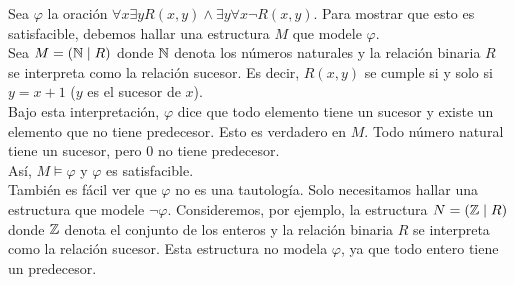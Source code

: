 \documentclass[12pt,a4paper]{book}
\begin{document}
    \begin{ejemplo}\label{ej:satisfacible-sucesor}
        Sea $\varphi$ la oración $\forall x\exists yR(x,y)\wedge\exists y\forall x\neg R(x,y)$. Para mostrar que esto es
        satisfacible, debemos hallar una estructura $M$ que modele $\varphi$.\\
        Sea $M=(\mathbb{N}\mid R)$ donde $\mathbb{N}$ denota los números naturales y la relación binaria $R$ se interpreta como la relación
        sucesor. Es decir, $R(x,y)$ se cumple si y solo si $y=x+1$ ($y$ es el sucesor de $x$).\\
        Bajo esta interpretación, $\varphi$ dice que todo elemento tiene un sucesor y existe un elemento que no tiene
        predecesor. Esto es verdadero en $M$. Todo número natural tiene un sucesor, pero 0 no tiene predecesor.\\
        Así, $M\models\varphi$ y $\varphi$ es satisfacible.\\
        También es fácil ver que $\varphi$ no es una tautología. Solo necesitamos hallar una estructura que modele
        $\neg\varphi$. Consideremos, por ejemplo, la estructura $N=(\mathbb{Z}\mid R)$ donde $\mathbb{Z}$ denota el conjunto de los enteros
        y la relación binaria $R$ se interpreta como la relación sucesor. Esta estructura no modela $\varphi$, ya que todo
        entero tiene un predecesor.
    \end{ejemplo}
\end{document}
